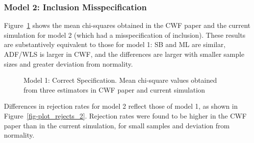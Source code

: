\documentclass[
  letterpaper,
  DIV=11,
  numbers=noendperiod]{scrartcl}
\begin{document}
\subsubsection{Model 2: Inclusion
Misspecification}\label{model-2-inclusion-misspecification}

Figure~\ref{fig-plot_chi_2} shows the mean chi-squares obtained in the
CWF paper and the current simulation for model 2 (which had a
misspecification of inclusion). These results are substantively
equivalent to those for model 1: SB and ML are similar, ADF/WLS is
larger in CWF, and the differences are larger with smaller sample sizes
and greater deviation from normality.

\begin{figure}[H]


\caption{\label{fig-plot_chi_2}Model 1: Correct Specification. Mean
chi-square values obtained from three estimators in CWF paper and
current simulation}

\end{figure}%

Differences in rejection rates for model 2 reflect those of model 1, as
shown in Figure~\ref{fig-plot_rejects_2}. Rejection rates were found to
be higher in the CWF paper than in the current simulation, for small
samples and deviation from normality.
\end{document}
